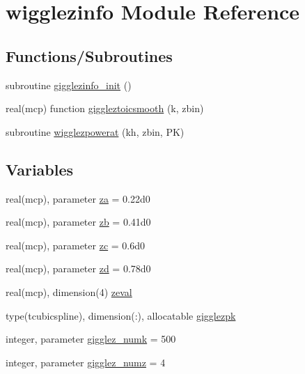\hypertarget{namespacewigglezinfo}{}\section{wigglezinfo Module Reference}
\label{namespacewigglezinfo}
\subsection*{Functions/\+Subroutines}
\begin{DoxyCompactItemize}
\item 
subroutine \mbox{\hyperlink{namespacewigglezinfo_a7c041022fefbb50e12a454d1cc60c14f}{gigglezinfo\+\_\+init}} ()
\item 
real(mcp) function \mbox{\hyperlink{namespacewigglezinfo_aa01d4906da1313fa5a21d8f3b5029f50}{giggleztoicsmooth}} (k, zbin)
\item 
subroutine \mbox{\hyperlink{namespacewigglezinfo_acb08f5ab3e49247de82dbfb12666f12e}{wigglezpowerat}} (kh, zbin, PK)
\end{DoxyCompactItemize}
\subsection*{Variables}
\begin{DoxyCompactItemize}
\item 
real(mcp), parameter \mbox{\hyperlink{namespacewigglezinfo_a5ee76ba0ebd66c8881b0128f64a73b98}{za}} = 0.\+22d0
\item 
real(mcp), parameter \mbox{\hyperlink{namespacewigglezinfo_a0caef290cd3d8b7306771479bd8589e5}{zb}} = 0.\+41d0
\item 
real(mcp), parameter \mbox{\hyperlink{namespacewigglezinfo_a6079d8a819afcd264b152ce14b1c9524}{zc}} = 0.\+6d0
\item 
real(mcp), parameter \mbox{\hyperlink{namespacewigglezinfo_aba81e5054787627511da43db2cab3e05}{zd}} = 0.\+78d0
\item 
real(mcp), dimension(4) \mbox{\hyperlink{namespacewigglezinfo_a8d9180a8b6d6e2d0fee91ed2c96901d1}{zeval}}
\item 
type(tcubicspline), dimension(\+:), allocatable \mbox{\hyperlink{namespacewigglezinfo_a6e6d78669da0432fe3a6e39caaf60e4c}{gigglezpk}}
\item 
integer, parameter \mbox{\hyperlink{namespacewigglezinfo_aeea1af41c9bde44daa886428c2d864af}{gigglez\+\_\+numk}} = 500
\item 
integer, parameter \mbox{\hyperlink{namespacewigglezinfo_a4a6cdfc8a72a4b74579fed9741cd9d05}{gigglez\+\_\+numz}} = 4
\end{DoxyCompactItemize}


